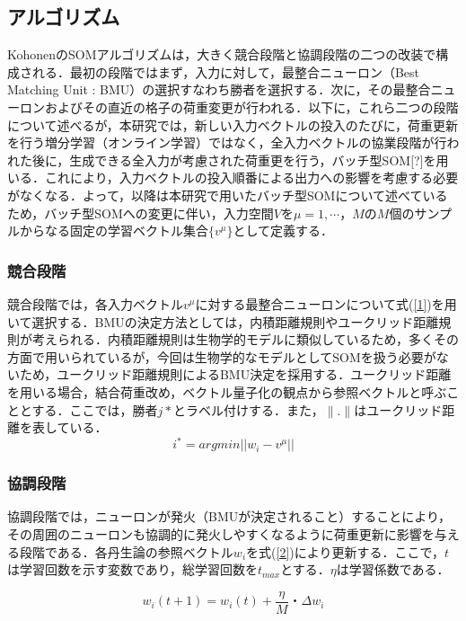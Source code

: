 \subsection{アルゴリズム}
KohonenのSOMアルゴリズムは，大きく競合段階と協調段階の二つの改装で構成される．最初の段階ではまず，入力に対して，最整合ニューロン（Best Matching Unit : BMU）の選択すなわち勝者を選択する．次に，その最整合ニューロンおよびその直近の格子の荷重変更が行われる．以下に，これら二つの段階について述べるが，本研究では，新しい入力ベクトルの投入のたびに，荷重更新を行う増分学習（オンライン学習）ではなく，全入力ベクトルの協業段階が行われた後に，生成できる全入力が考慮された荷重更を行う，バッチ型SOM[?]を用いる．これにより，入力ベクトルの投入順番による出力への影響を考慮する必要がなくなる．よって，以降は本研究で用いたバッチ型SOMについて述べているため，バッチ型SOMへの変更に伴い，入力空間$V$を$ \mu = 1, \cdots，M$の$M$個のサンプルからなる固定の学習ベクトル集合$\{v^\mu\}$として定義する．
\subsubsection{競合段階}
競合段階では，各入力ベクトル$v^\mu$に対する最整合ニューロンについて式(\ref{1})を用いて選択する．BMUの決定方法としては，内積距離規則やユークリッド距離規則が考えられる．内積距離規則は生物学的モデルに類似しているため，多くその方面で用いられているが，今回は生物学的なモデルとしてSOMを扱う必要がないため，ユークリッド距離規則によるBMU決定を採用する．ユークリッド距離を用いる場合，結合荷重改め，ベクトル量子化の観点から参照ベクトルと呼ぶこととする．ここでは，勝者$j*$とラベル付けする．また，$\|.\|$はユークリッド距離を表している．
\begin{equation}
\label{1}
  i^* = argmin||w_i - v^\mu||
\end{equation}

\subsubsection{協調段階}
協調段階では，ニューロンが発火（BMUが決定されること）することにより，その周囲のニューロンも協調的に発火しやすくなるように荷重更新に影響を与える段階である．各丹生論の参照ベクトル$w_i$を式(\ref{2})により更新する．ここで，$t$は学習回数を示す変数であり，総学習回数を$t_{max}$とする．$\eta$は学習係数である．

\begin{equation}
\label{2}
w_i(t+1) = w_i(t)+\frac{\eta}{M}・\Delta w_i
\end{equation}

